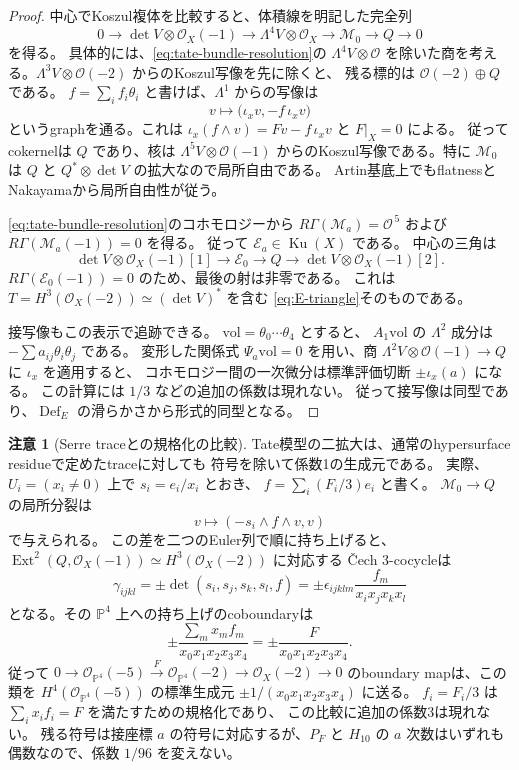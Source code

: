 \documentclass[a4paper,11pt]{ltjsarticle}
\theoremstyle{definition}
\newtheorem{remark}[theorem]{注意}
\newcommand{\OO}{\mathcal O}
\newcommand{\PP}{\mathbb P}
\newcommand{\Ku}{\operatorname{Ku}}
\newcommand{\Def}{\operatorname{Def}}
\newcommand{\Ext}{\operatorname{Ext}}
\begin{document}
\begin{proof}
中心でKoszul複体を比較すると、体積線を明記した完全列
\[
 0\longrightarrow\det V\otimes\OO_X(-1)
 \longrightarrow\Lambda^4V\otimes\OO_X
 \longrightarrow\mathcal M_0
 \longrightarrow Q\longrightarrow0
 \tag{T7}\label{eq:tate-central-evaluation}
\]
を得る。
具体的には、\eqref{eq:tate-bundle-resolution}の $\Lambda^4V\otimes\OO$
を除いた商を考える。$\Lambda^3V\otimes\OO(-2)$ からのKoszul写像を先に除くと、
残る標的は $\OO(-2)\oplus Q$ である。
$f=\sum_i f_i\theta_i$ と書けば、$\Lambda^1$ からの写像は
\[
 v\longmapsto\bigl(\iota_xv,-f\,\iota_xv\bigr)
\]
というgraphを通る。これは
$\iota_x(f\wedge v)=Fv-f\,\iota_xv$ と $F|_X=0$ による。
従ってcokernelは $Q$ であり、核は $\Lambda^5V\otimes\OO(-1)$
からのKoszul写像である。特に $\mathcal M_0$ は $Q$ と
$Q^*\otimes\det V$ の拡大なので局所自由である。
Artin基底上でもflatnessとNakayamaから局所自由性が従う。

\eqref{eq:tate-bundle-resolution}のコホモロジーから
$R\Gamma(\mathcal M_a)=\OO^{\,5}$ および
$R\Gamma(\mathcal M_a(-1))=0$ を得る。
従って $\mathcal E_a\in\Ku(X)$ である。
中心の三角は
\[
 \det V\otimes\OO_X(-1)[1]\longrightarrow\mathcal E_0
 \longrightarrow Q\longrightarrow\det V\otimes\OO_X(-1)[2].
\]
$R\Gamma(\mathcal E_0(-1))=0$ のため、最後の射は非零である。
これは $T=H^3(\OO_X(-2))\simeq(\det V)^*$ を含む
\eqref{eq:E-triangle}そのものである。

接写像もこの表示で追跡できる。
$\mathrm{vol}=\theta_0\cdots\theta_4$ とすると、
$A_1\mathrm{vol}$ の $\Lambda^2$ 成分は $-\sum a_{ij}\theta_i\theta_j$ である。
変形した関係式 $\Psi_a\mathrm{vol}=0$ を用い、商
$\Lambda^2V\otimes\OO(-1)\to Q$ に $\iota_x$ を適用すると、
コホモロジー間の一次微分は標準評価切断 $\pm\iota_x(a)$ になる。
この計算には $1/3$ などの追加の係数は現れない。
従って接写像は同型であり、$\Def_E$ の滑らかさから形式的同型となる。
\end{proof}


\begin{remark}[Serre traceとの規格化の比較]
\label{rem:tate-serre-trace-normalization}
Tate模型の二拡大は、通常のhypersurface residueで定めたtraceに対しても
符号を除いて係数1の生成元である。
実際、$U_i=(x_i\ne0)$ 上で $s_i=e_i/x_i$ とおき、
$f=\sum_i(F_i/3)e_i$ と書く。
$\mathcal M_0\to Q$ の局所分裂は
\[
 v\longmapsto(-s_i\wedge f\wedge v,v)
\]
で与えられる。
この差を二つのEuler列で順に持ち上げると、
$\Ext^2(Q,\OO_X(-1))\simeq H^3(\OO_X(-2))$ に対応する
\v Cech 3-cocycleは
\[
 \gamma_{ijkl}
   =\pm\det(s_i,s_j,s_k,s_l,f)
   =\pm\epsilon_{ijklm}\frac{f_m}{x_ix_jx_kx_l}
\]
となる。その $\PP^4$ 上への持ち上げのcoboundaryは
\[
 \pm\frac{\sum_m x_mf_m}{x_0x_1x_2x_3x_4}
   =\pm\frac{F}{x_0x_1x_2x_3x_4}.
\]
従って $0\to\OO_{\PP^4}(-5)\xrightarrow{F}\OO_{\PP^4}(-2)
\to\OO_X(-2)\to0$ のboundary mapは、この類を
$H^4(\OO_{\PP^4}(-5))$ の標準生成元
$\pm1/(x_0x_1x_2x_3x_4)$ に送る。
$f_i=F_i/3$ は $\sum_i x_if_i=F$ を満たすための規格化であり、
この比較に追加の係数3は現れない。
残る符号は接座標 $a$ の符号に対応するが、$P_F$ と $H_{10}$ の
$a$ 次数はいずれも偶数なので、係数 $1/96$ を変えない。
\end{remark}
\end{document}
